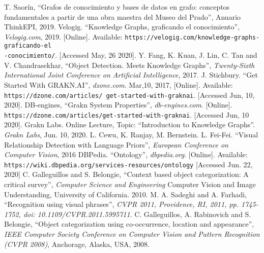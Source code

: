 \begin{thebibliography}{00}
  T. Saorín, ``Grafos de conocimiento y bases de datos en grafo:
  conceptos fundamentales a partir de una obra maestra del Museo del Prado'',
  Anuario ThinkEPI, 2019.
  Velogig. ``Knowledge Graphs, graficando el conocimiento'', 
  \textit{Velogig.com}, 2019. [Online]. Available: 
  \texttt{https://velogig.com/knowledge-graphs-graficando-el\\-conocimiento/}.
  [Accessed May, 26 2020].
  Y. Fang, K. Kuan, J. Lin, C. Tan and V. Chandrasekhar,
  ``Object Detection. Meets Knowledge Graphs'', 
  \textit{Twenty-Sixth International Joint Conference on Artificial 
  Intelligence}, 2017.
  J. Stichbury. ``Get Started With GRAKN.AI'', \textit{dzone.com}. Mar,10, 2017,
  [Online]. Available: \texttt{https://dzone.com/articles/
  get-started-with-graknai}. [Accessed Jun, 10, 2020].  
  DB-engines, ``Grakn System Properties'', \textit{db-engines.com}.
  [Online]. \texttt{https://dzone.com/articles/get-started-with-graknai}.
  [Accessed Jun, 10 2020].
  Grakn Labs. Online Lecture, Topic: ``Introduction to Knowledge Graphs''.
  \textit{Grakn Labs}, Jun. 10, 2020.
  L. Cewu, K. Ranjay, M. Bernstein. L. Fei-Fei.
  ``Visual Relationship Detection with Language Priors'',
  \textit{European Conference on Computer Vision}, 2016
  DBPedia. ``Ontology'', \textit{dbpedia.org}. [Online]. Available:
  \texttt{https://wiki.dbpedia.org/services-resources/ontology}  
  [Accessed Jun.  22, 2020]  
  C. Galleguillos and S. Belongie, ``Context based object categorization: 
  A critical survey'', \textit{Computer Science and Engineering} 
   Computer Vision and Image Understanding, University of California. 2010.
  M. A. Sadeghi and A. Farhadi, ``Recognition using visual phrases'', 
  \textit{CVPR 2011, Providence, RI, 2011, pp. 1745-1752, 
  doi: 10.1109/CVPR.2011.5995711}.
   C. Galleguillos, A. Rabinovich and S. Belongie, ``Object  
   categorization  using  co-occurrence, location and appearance'',
   \textit{ IEEE Computer Society Conference on Computer Vision and Pattern
   Recognition (CVPR 2008)}, Anchorage, Alaska, USA, 2008.
\end{thebibliography}

